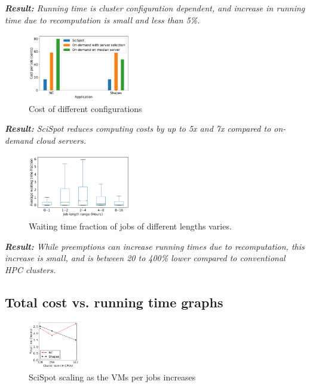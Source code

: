 \noindent \emph{ \textbf{Result:} Running time is cluster configuration dependent, and increase in running time due to recomputation is small and less than 5\%.}



\begin{figure}
  \centering
  \includegraphics[width=0.4\textwidth]{../graphs/cost-only-bar.pdf}
  \caption{Cost of different configurations}
  \label{fig:cost-only-bar}
\end{figure}

\noindent \emph{ \textbf{Result:} SciSpot reduces computing costs by up to 5x and 7x compared to on-demand cloud servers.}

\begin{figure}
  \includegraphics[width=0.4\textwidth]{../graphs/waiting_time_buckets.pdf}
  \caption{Waiting time fraction of jobs of different lengths varies.}
  \label{fig:hpc-wait-buckets}  
\end{figure}

\noindent \emph{ \textbf{Result:} While preemptions can increase running times due to recomputation, this increase is small, and is between 20 to 400\% lower compared to conventional HPC clusters. }

\subsection{Total cost vs. running time graphs}

\begin{figure}
  \includegraphics[width=0.2\textwidth]{../graphs/vm-per-job-scaling.pdf}
  \caption{SciSpot scaling as the VMs per jobs increases}
  \label{fig:vm-per-job-scaling}
\end{figure}

